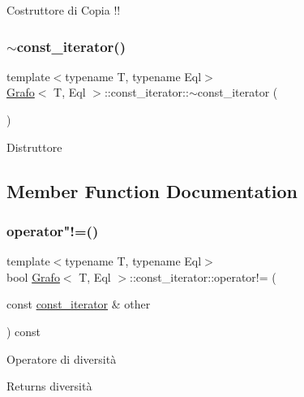 Costruttore di Copia !! \mbox{\label{classGrafo_1_1const__iterator_a606a1974a27b2cccb8bacd85c9f748e1}} 
\subsubsection{\texorpdfstring{$\sim$const\+\_\+iterator()}{~const\_iterator()}}
{\footnotesize\ttfamily template$<$typename T, typename Eql$>$ \\
\hyperlink{classGrafo}{Grafo}$<$ T, Eql $>$\+::const\+\_\+iterator\+::$\sim$const\+\_\+iterator (\begin{DoxyParamCaption}{ }\end{DoxyParamCaption})\hspace{0.3cm}{\ttfamily [inline]}}

Distruttore 

\subsection{Member Function Documentation}
\mbox{\label{classGrafo_1_1const__iterator_a79963290c733e39cac4e4a38a14879bb}} 
\subsubsection{\texorpdfstring{operator"!=()}{operator!=()}}
{\footnotesize\ttfamily template$<$typename T, typename Eql$>$ \\
bool \hyperlink{classGrafo}{Grafo}$<$ T, Eql $>$\+::const\+\_\+iterator\+::operator!= (\begin{DoxyParamCaption}\item[{const \hyperlink{classGrafo_1_1const__iterator}{const\+\_\+iterator} \&}]{other }\end{DoxyParamCaption}) const\hspace{0.3cm}{\ttfamily [inline]}}

Operatore di diversità \begin{DoxyReturn}{Returns}
diversità 
\end{DoxyReturn}
\mbox{\label{classGrafo_1_1const__iterator_aa25a4fda1bd56ab6f1e8066f547c77fb}} 
